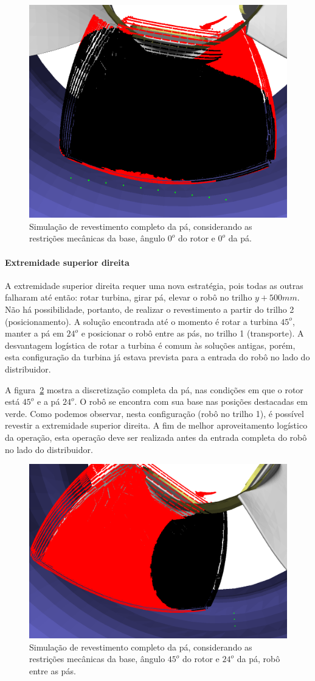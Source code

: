 \begin{figure}[!ht]
	\centering	
	\includegraphics[width=.5\columnwidth]{figs/simcomp1_4.png}
	\caption{Simulação de revestimento completo da pá, considerando as
	restrições mecânicas da base, ângulo $0^o$ do rotor e $0^o$ da pá.}
	\label{fig::simcomp1_4}
\end{figure}

\paragraph{Extremidade superior direita}
A extremidade superior direita requer uma nova estratégia, pois todas as
outras falharam até então: rotar turbina, girar pá, elevar o robô no trilho
$y+500 mm$. Não há possibilidade, portanto, de realizar o revestimento a partir
do trilho 2 (posicionamento). A solução encontrada até o momento é rotar a
turbina $45^o$, manter a pá em $24^o$ e posicionar o robô entre as pás, no
trilho 1 (transporte). A desvantagem logística de rotar a turbina é comum às
soluções antigas, porém, esta configuração da turbina já estava prevista para
a entrada do robô no lado do distribuidor.

A figura~\ref{fig::simcomp1_7} mostra a discretização completa da pá, nas
condições em que o rotor está $45^o$ e a pá $24^o$. O robô se encontra
com sua base nas posições destacadas em verde. Como podemos observar, nesta
configuração (robô no trilho 1), é possível revestir a extremidade
superior direita. A fim de melhor aproveitamento logístico da
operação, esta operação deve ser realizada antes da entrada completa
do robô no lado do distribuidor.

\begin{figure}[!ht]
	\centering	
	\includegraphics[width=.5\columnwidth]{figs/simcomp1_7.png}
	\caption{Simulação de revestimento completo da pá, considerando as
	restrições mecânicas da base, ângulo $45^o$ do rotor e $24^o$ da pá, robô
	entre as pás.}
	\label{fig::simcomp1_7}
\end{figure}

